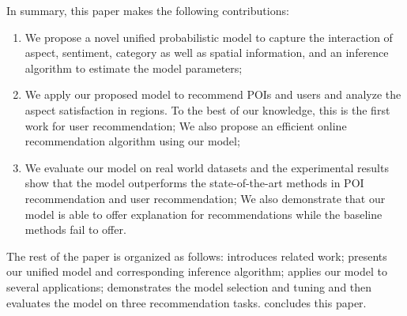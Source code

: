 In summary, this paper makes the following contributions:
\begin{enumerate}
\item We propose a novel unified probabilistic model to capture the interaction of
aspect, sentiment, category as well as spatial information, and an 
inference algorithm to estimate the model parameters;
\item We apply our proposed model to recommend POIs and users
and analyze the aspect satisfaction in regions. To the best of our knowledge, this is the first work 
for user recommendation; We also propose an efficient online 
recommendation algorithm using our model;
\item We evaluate our model on real world datasets and the experimental results
show that the model outperforms the state-of-the-art methods
in POI recommendation and user recommendation; We also demonstrate that our model
is able to offer explanation for recommendations
while the baseline methods \cite{YeGeoSocial:2011} fail to offer.
\end{enumerate}

The rest of the paper is organized as follows:
 introduces related work;
 presents
our unified model and corresponding inference algorithm;
 applies our model to several applications;
 demonstrates the model selection and tuning and
then evaluates the model on three recommendation tasks.
 concludes this paper.

